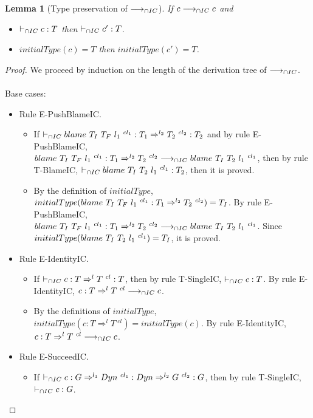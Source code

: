 \documentclass[a4paper]{article}
\newtheorem{lemma}{Lemma}[section]
\begin{document}
\begin{lemma}[Type preservation of $\longrightarrow_{\cap IC}$]
\label{type_preservationIC}
If $c \longrightarrow_{\cap IC} c$ and
\begin{itemize}
    \item $\vdash_{\cap IC} c : T$ then $\vdash_{\cap IC} c' : T$.
    \item $initialType(c) = T$ then $initialType(c') = T$.
\end{itemize}
\end{lemma}
\begin{proof}
We proceed by induction on the length of the derivation tree of $\longrightarrow_{\cap IC}$.\\\\
Base cases:
\begin{itemize}
    \item Rule E-PushBlameIC.
    \begin{itemize}
        \item If $\vdash_{\cap IC} blame\ T_I\ T_F\ l_1\ ^{cl_1} : T_1 \Rightarrow^{l_2} T_2\ ^{cl_2} : T_2$ and by rule E-PushBlameIC, $blame\ T_I\ T_F\ l_1\ ^{cl_1} : T_1 \Rightarrow^{l_2} T_2\ ^{cl_2} \longrightarrow_{\cap IC} blame\ T_I\ T_2\ l_1\ ^{cl_1}$, then by rule T-BlameIC, $\vdash_{\cap IC} blame\ T_I\ T_2\ l_1\ ^{cl_1} : T_2$, then it is proved.
        \item By the definition of $initialType$, $initialType(blame\ T_I\ T_F\ l_1\ ^{cl_1} : T_1 \Rightarrow^{l_2} T_2\ ^{cl_2}) = T_I$.
        By rule E-PushBlameIC, $blame\ T_I\ T_F\ l_1\ ^{cl_1} : T_1 \Rightarrow^{l_2} T_2\ ^{cl_2} \longrightarrow_{\cap IC} blame\ T_I\ T_2\ l_1\ ^{cl_1}$.
        Since $initialType(blame\ T_I\ T_2\ l_1\ ^{cl_1}) = T_I$, it is proved.
    \end{itemize}
    \item Rule E-IdentityIC.
    \begin{itemize}
        \item If $\vdash_{\cap IC} c : T \Rightarrow^l T\ ^{cl} : T$, then by rule T-SingleIC, $\vdash_{\cap IC} c : T$.
        By rule E-IdentityIC, $c : T \Rightarrow^l T\ ^{cl} \icos c$.
        \item By the definitions of $initialType$, $initialType(c : T \Rightarrow^l T\ ^{cl}) = initialType(c)$.
        By rule E-IdentityIC, $c : T \Rightarrow^l T\ ^{cl} \icos c$.
    \end{itemize}
    \item Rule E-SucceedIC.
    \begin{itemize}
        \item If $\icts c : G \Rightarrow^{l_1} \Dyn\ ^{cl_1} : \Dyn \Rightarrow^{l_2} G\ ^{cl_2} : G$, then by rule T-SingleIC, $\vdash_{\cap IC} c : G$.

\end{itemize}
\end{itemize}
\end{proof}
\end{document}
